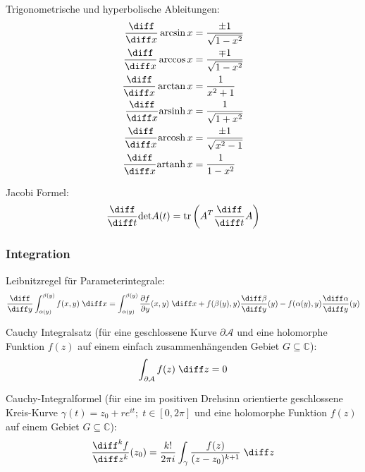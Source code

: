 \documentclass[11pt]{article}
\numberwithin{equation}{section}
\begin{document}
				Trigonometrische und hyperbolische Ableitungen:
				\begin{equation}
					\begin{split}
						\frac{\diff}{\diff x}\arcsin x &= \frac{\pm 1}{\sqrt{1-x^2}} \\
						\frac{\diff}{\diff x}\arccos x &= \frac{\mp 1}{\sqrt{1-x^2}} \\
						\frac{\diff}{\diff x}\arctan x &= \frac{1}{x^2+1} \\
						\frac{\diff}{\diff x}\mathrm{arsinh}\,x &= \frac{1}{\sqrt{1+x^2}} \\
						\frac{\diff}{\diff x}\mathrm{arcosh}\,x &= \frac{\pm 1}{\sqrt{x^2-1}} \\
						\frac{\diff}{\diff x}\mathrm{artanh}\,x &= \frac{1}{1-x^2} \\
					\end{split}
				\end{equation}

        Jacobi Formel:
        \begin{equation}
          \tder{}{t}\mathrm{det} A(t) = \mathrm{tr}\left(A^T \tder{}{t} A\right)
        \end{equation}

  		\subsubsection{Integration}
        Leibnitzregel für Parameterintegrale:
        \begin{equation}
          \tder{}{y} \int_{\alpha(y)}^{\beta(y)}f(x,y)\;\diff x = \int_{\alpha(y)}^{\beta(y)} \pder{f}{y}(x,y)\;\diff x + f(\beta(y),y)\tder{\beta}{y}(y)-f(\alpha(y),y)\tder{\alpha}{y}(y)
        \end{equation}

        Cauchy Integralsatz (für eine geschlossene Kurve $\partial \mathcal{A}$ und eine holomorphe Funktion $f(z)$ auf einem einfach zusammenhängenden Gebiet $G \subseteq \mathbb{C}$):
        \begin{equation}
          \int_{\partial \mathcal{A}} f(z)\;\diff z = 0
        \end{equation}

        Cauchy-Integralformel (für eine im positiven Drehsinn orientierte geschlossene Kreis-Kurve $\gamma(t)=z_0+re^{it};\;t\in[0,2\pi]$ und eine holomorphe Funktion $f(z)$ auf einem Gebiet $G \subseteq \mathbb{C}$):
        \begin{equation}
          \frac{\diff^k f}{\diff z^k}(z_0) = \frac{k!}{2\pi i} \int_\gamma \frac{f(z)}{(z-z_0)^{k+1}}\;\diff z
        \end{equation}
\end{document}
